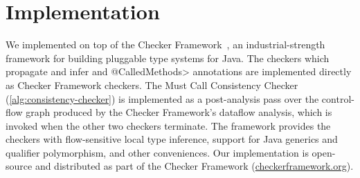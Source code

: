 \section{Implementation}
\label{sec:implementation}

We implemented \tool on top of the Checker Framework~\cite{PapiACPE2008},
an industrial-strength framework for building pluggable type systems
for Java. The checkers which propagate and infer \MustCall and
\<@CalledMethods> annotations are implemented
directly as Checker Framework checkers.  The Must Call Consistency
Checker (\cref{alg:consistency-checker}) is
implemented as a post-analysis pass over the control-flow graph
produced by the Checker Framework's dataflow analysis, which is invoked
when the other two checkers terminate. The framework provides the
checkers with flow-sensitive local type
inference, support for Java generics and qualifier polymorphism, and
other conveniences. Our implementation is open-source and
distributed as part of the Checker Framework (\url{checkerframework.org}).

